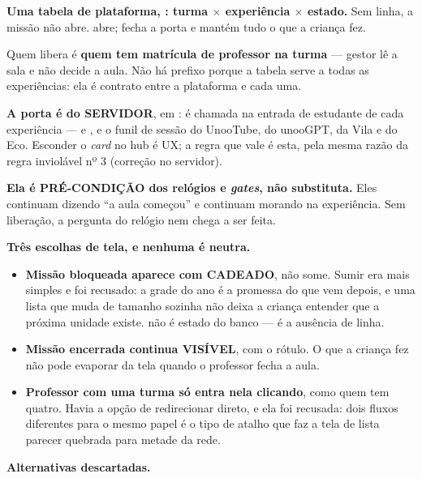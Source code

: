 \begin{decisao}
\textbf{Uma tabela de plataforma, : turma $\times$ experiência
$\times$ estado.} Sem linha, a missão não abre.  abre;
 fecha a porta e mantém tudo o que a criança fez.

Quem libera é \textbf{quem tem matrícula de professor na turma} --- gestor lê a
sala e não decide a aula. Não há prefixo  porque a tabela serve a
todas as experiências: ela é contrato entre a plataforma e cada uma.

\textbf{A porta é do SERVIDOR}, em : 
é chamada na entrada de estudante de cada experiência ---  e
, e o funil de sessão do UnooTube, do unooGPT, da Vila e do
Eco. Esconder o \emph{card} no hub é UX; a regra que vale é esta, pela mesma
razão da regra inviolável nº 3 (correção no servidor).

\textbf{Ela é PRÉ-CONDIÇÃO dos relógios e \emph{gates}, não substituta.} Eles
continuam dizendo \enquote{a aula começou} e continuam morando na experiência.
Sem liberação, a pergunta do relógio nem chega a ser feita.
\end{decisao}

\textbf{Três escolhas de tela, e nenhuma é neutra.}

\begin{itemize}
  \item \textbf{Missão bloqueada aparece com CADEADO}, não some. Sumir era mais
    simples e foi recusado: a grade do ano é a promessa do que vem depois, e uma
    lista que muda de tamanho sozinha não deixa a criança entender que a próxima
    unidade existe.  não é estado do banco --- é a ausência de
    linha.
  \item \textbf{Missão encerrada continua VISÍVEL}, com o rótulo. O que a
    criança fez não pode evaporar da tela quando o professor fecha a aula.
  \item \textbf{Professor com uma turma só entra nela clicando}, como quem tem
    quatro. Havia a opção de redirecionar direto, e ela foi recusada: dois
    fluxos diferentes para o mesmo papel é o tipo de atalho que faz a tela de
    lista parecer quebrada para metade da rede.
\end{itemize}

\textbf{Alternativas descartadas.}

